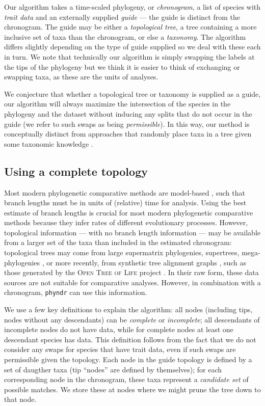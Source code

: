 \documentclass[a4paper,11pt]{article}
\newcommand{\phyndr}{\tt phyndr}
\begin{document}
Our algorithm takes a time-scaled phylogeny, or \emph{chronogram}, a list of species with \emph{trait data} and an externally supplied \emph{guide} --- the guide is distinct from the chronogram. The guide may be either a \emph{topological tree}, a tree containing a more inclusive set of taxa than the chronogram, or else a \emph{taxonomy}. The algorithm differs slightly depending on the type of guide supplied so we deal with these each in turn. We note that technically our algorithm is simply swapping the labels at the tips of the phylogeny but we think it is easier to think of exchanging or swapping taxa, as these are the units of analyses.

We conjecture that whether a topological tree or taxonomy is supplied as a guide, our algorithm will always maximize the intersection of the species in the phylogeny and the dataset without inducing any splits that do not occur in the guide (we refer to such swaps as being \emph{permissible}). In this way, our method is conceptually distinct from approaches that randomly place taxa in a tree given some taxonomic knowledge \citep{Kuhn2011, Jetz2012, ThomasPastis}.

\subsection{Using a complete topology}

Most modern phylogenetic comparative methods are model-based \citep[see recent reviews by][]{omeara-2012, PennellHarmon}, such that branch lengths must be in units of (relative) time for analysis. Using the best estimate of branch lengths is crucial for most modern phylogenetic comparative methods because they infer rates of different evolutionary processes.  However, topological information --- with no branch length information --- may be available from a larger set of the taxa than included in the estimated chronogram: topological trees may come from large supermatrix phylogenies, supertrees, mega-phylogenies \citep[\emph{sensu}][]{Smithmega}, or more recently, from synthetic tree alignment graphs \citep{Smith2013}, such as those generated by the \textsc{Open Tree of Life} project \citep{OpenTree}. In their raw form, these data sources are not suitable for comparative analyses. However, in combination with a chronogram, {\phyndr} can use this information.

We use a few key definitions to explain the algorithm: all nodes (including tips, nodes without any descendants) can be \emph{complete} or \emph{incomplete}; all descendants of incomplete nodes do not have data, while for complete nodes at least one descendant species has data.  This definition follows from the fact that we do not consider any swaps for species that have trait data, even if such swaps are permissible given the topology. Each node in the guide topology is defined by a set of daugther taxa (tip ``nodes'' are defined by themselves); for each corresponding node in the chronogram, these taxa represent a \emph{candidate set} of possible matches. We store these at nodes where we might prune the tree down to that node.
\end{document}
